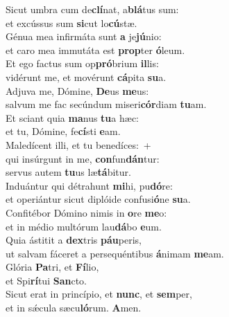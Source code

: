 \evenverse Sicut umbra cum de\textbf{clí}nat, a\textbf{blá}tus sum:~\*\\
\evenverse et excússus sum \textbf{si}cut lo\textbf{cú}stæ.\\
\oddverse Génua mea infirmáta sunt \textbf{a} je\textbf{jú}nio:~\*\\
\oddverse et caro mea immutáta est \textbf{prop}ter \textbf{ó}leum.\\
\evenverse Et ego factus sum op\textbf{pró}brium \textbf{il}lis:~\*\\
\evenverse vidérunt me, et movérunt \textbf{cá}pita \textbf{su}a.\\
\oddverse Adjuva me, Dómine, \textbf{De}us \textbf{me}us:~\*\\
\oddverse salvum me fac secúndum miseri\textbf{cór}diam \textbf{tu}am.\\
\evenverse Et sciant quia \textbf{ma}nus \textbf{tu}a hæc:~\*\\
\evenverse et tu, Dómine, fe\textbf{cí}sti \textbf{e}am.\\
\oddverse Maledícent illi, et tu benedíces:~+\\
\oddverse  qui insúrgunt in me, \textbf{con}fun\textbf{dán}tur:~\*\\
\oddverse servus autem \textbf{tu}us læ\textbf{tá}bitur.\\
\evenverse Induántur qui détrahunt \textbf{mi}hi, pu\textbf{dó}re:~\*\\
\evenverse et operiántur sicut diplóide confusi\textbf{ó}ne \textbf{su}a.\\
\oddverse Confitébor Dómino nimis in \textbf{o}re \textbf{me}o:~\*\\
\oddverse et in médio multórum lau\textbf{dá}bo \textbf{e}um.\\
\evenverse Quia ástitit a \textbf{dex}tris \textbf{páu}peris,~\*\\
\evenverse ut salvam fáceret a persequéntibus \textbf{á}nimam \textbf{me}am.\\
\oddverse Glória \textbf{Pa}tri, et \textbf{Fí}lio,~\*\\
\oddverse et Spi\textbf{rí}tui \textbf{San}cto.\\
\evenverse Sicut erat in princípio, et \textbf{nunc}, et \textbf{sem}per,~\*\\
\evenverse et in sǽcula sæcu\textbf{ló}rum. \textbf{A}men.\\
